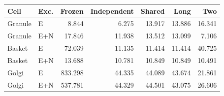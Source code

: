 \begin{tabular}{llrrrrr}
\toprule
Cell & Exc. & Frozen & Independent & Shared & Long & Two\\
\midrule
Granule & E & 8.844 & 6.275 & 13.917 & 13.886 & 16.341 \\
Granule & E+N & 17.846 & 11.938 & 13.512 & 13.099 & 7.106 \\
Basket & E & 72.039 & 11.135 & 11.414 & 11.414 & 40.725 \\
Basket & E+N & 13.688 & 10.781 & 10.849 & 10.849 & 10.491 \\
Golgi & E & 833.298 & 44.335 & 44.089 & 43.674 & 21.861 \\
Golgi & E+N & 537.781 & 44.329 & 44.501 & 43.075 & 26.606 \\
\bottomrule
\end{tabular}
